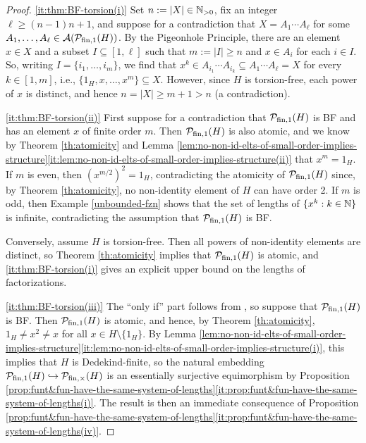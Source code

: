 \begin{proof}
	\ref{it:thm:BF-torsion(i)}
	Set $n := |X| \in \mathbb{N}_{>0}$, fix an integer $\ell \ge (n-1)n + 1$, and suppose for a contradiction that $X = A_1\cdots A_\ell$ for some $A_1,\dots, A_\ell\in \mathcal{A}(\mathcal{P}_{\textrm{fin}, 1}(H))$.
	By the Pigeonhole Principle, there are an element $x\in X$ and a subset $I \subseteq [ 1,\ell ]$ such that $m := |I| \ge n$ and $x \in A_i$ for each $i\in I$.
	So, writing $I = \{i_1,\ldots, i_m\}$, we find that $x^k \in A_{i_1} \cdots A_{i_k} \subseteq A_1\cdots A_\ell = X$ for every $k \in [ 1, m ]$, i.e., $\{1_H,x,\dots, x^m\} \subseteq X$.
	However, since $H$ is torsion-free, each power of $x$ is distinct, and hence $n = |X| \ge m+1 > n$ (a contradiction).
	
	\ref{it:thm:BF-torsion(ii)}
	First suppose for a contradiction that $\mathcal{P}_{\textrm{fin}, 1}(H)$ is BF and has an element $x$ of finite order $m$. Then $\mathcal{P}_{\textrm{fin}, 1}(H)$ is also atomic, and we know by Theorem \ref{th:atomicity} and Lemma \ref{lem:no-non-id-elts-of-small-order-implies-structure}\ref{it:lem:no-non-id-elts-of-small-order-implies-structure(ii)} that $x^m = 1_H$.
	If $m$ is even, then $(x^{m/2})^2 = 1_H$, contradicting the atomicity of $\mathcal{P}_{\textrm{fin}, 1}(H)$ since, by Theorem \ref{th:atomicity}, no non-identity element of $H$ can have order 2. 
	If $m$ is odd, then Example \ref{unbounded-fzn} shows that the set of lengths of $\{x^k : k \in \mathbb{N} \}$ is infinite, contradicting the assumption that $\mathcal{P}_{\textrm{fin}, 1}(H)$ is BF.
	
	Conversely, assume $H$ is torsion-free. Then all powers of non-identity elements are distinct, so Theorem \ref{th:atomicity} implies that $\mathcal{P}_{\textrm{fin}, 1}(H)$ is atomic, and \ref{it:thm:BF-torsion(i)} gives an explicit upper bound on the lengths of factorizations.
	
	\ref{it:thm:BF-torsion(iii)} 
	The ``only if'' part follows from \cite[Theorem 2.28(iv) and Corollary 2.29]{fan-tringali18}, so suppose that $\mathcal{P}_{\textrm{fin}, 1}(H)$ is BF.
	Then $\mathcal{P}_{\textrm{fin}, 1}(H)$ is atomic, and hence, by Theorem \ref{th:atomicity}, $1_H \neq x^2 \neq x$ for all $x\in H\setminus\{1_H\}$.
	By Lemma \ref{lem:no-non-id-elts-of-small-order-implies-structure}\ref{it:lem:no-non-id-elts-of-small-order-implies-structure(i)}, this implies that $H$ is Dedekind-finite, so the natural embedding $\mathcal{P}_{\textrm{fin}, 1}(H)\hookrightarrow\mathcal{P}_{\textrm{fin}, \times}(H)$ is an essentially surjective equimorphism by Proposition \ref{prop:funt&fun-have-the-same-system-of-lengths}\ref{it:prop:funt&fun-have-the-same-system-of-lengths(i)}.
	The result is then an immediate consequence of Proposition  \ref{prop:funt&fun-have-the-same-system-of-lengths}\ref{it:prop:funt&fun-have-the-same-system-of-lengths(iv)}.
\end{proof}





